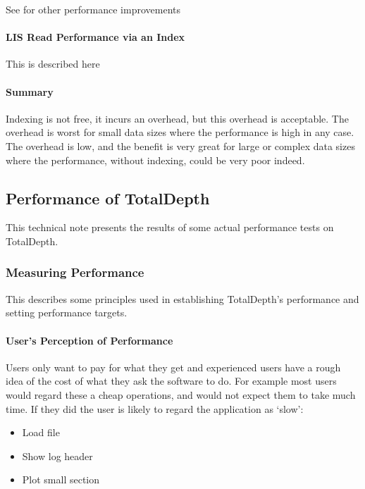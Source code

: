 \documentclass[letterpaper,10pt,english]{sphinxmanual}
\begin{document}
See {\hyperref[\detokenize{tech/performance:totaldepth-tech-perf-improve}]{}} for other performance improvements


\paragraph{LIS Read Performance via an Index}
\label{\detokenize{tech/LIS_indexing:lis-read-performance-via-an-index}}
This is described here {\hyperref[\detokenize{tech/performance:totaldepth-tech-lis-read-perf}]{}}


\paragraph{Summary}
\label{\detokenize{tech/LIS_indexing:summary}}
Indexing is not free, it incurs an overhead, but this overhead is acceptable. The overhead is worst for small data sizes where the performance is high in any case. The overhead is low, and the benefit is very great for large or complex data sizes where the performance, without indexing, could be very poor indeed.


\subsection{Performance of TotalDepth}
\label{\detokenize{tech/performance:totaldepth-tech-lis-read-perf}}\label{\detokenize{tech/performance::doc}}\label{\detokenize{tech/performance:performance-of-totaldepth}}
This technical note presents the results of some actual performance tests on TotalDepth.


\subsubsection{Measuring Performance}
\label{\detokenize{tech/performance:measuring-performance}}
This describes some principles used in establishing TotalDepth’s performance and setting performance targets.


\paragraph{User’s Perception of Performance}
\label{\detokenize{tech/performance:user-s-perception-of-performance}}
Users only want to pay for what they get and experienced users have a rough idea of the cost of what they ask the software to do. For example most users would regard these a cheap operations, and would not expect them to take much time. If they did the user is likely to regard the application as ‘slow’:
\begin{itemize}
\item {} 
Load file

\item {} 
Show log header

\item {} 
Plot small section

\end{itemize}
\end{document}
